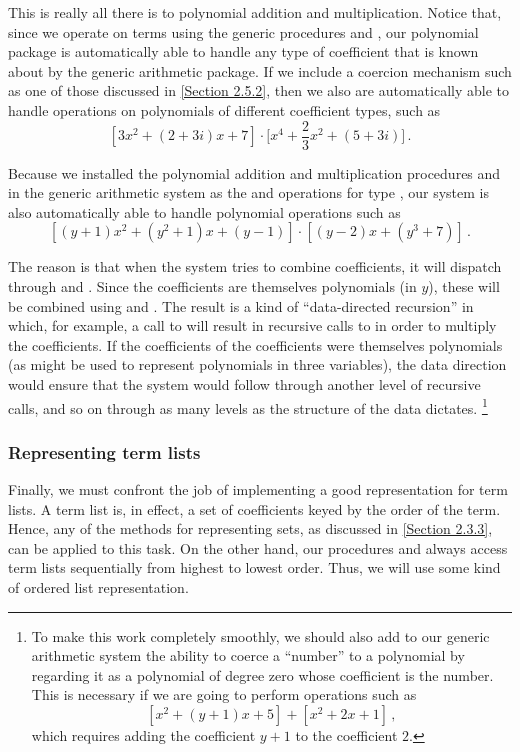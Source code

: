 This is really all there is to polynomial addition and multiplication.
Notice that, since we operate on terms using the generic procedures  and , our polynomial package is automatically able to handle any type of coefficient that is known about by the generic arithmetic package.
If we include a coercion mechanism such as one of those discussed in \cref{Section 2.5.2}, then we also are automatically able to handle operations on polynomials of different coefficient types, such as
\[
	[3 x^2 + (2 + 3i) x + 7]
	⋅ \biggl[ x^4 + \frac{2}{3} x^2 + (5 + 3i) \biggr] \,.
\]

Because we installed the polynomial addition and multiplication procedures  and  in the generic arithmetic system as the  and  operations for type , our system is also automatically able to handle polynomial operations such as
\[
	[ (y + 1) x^2 + (y^2 + 1) x + (y - 1) ] ⋅ [ (y - 2) x + (y^3 + 7) ] \,.
\]

The reason is that when the system tries to combine coefficients, it will dispatch through  and .
Since the coefficients are themselves polynomials (in \( y \)), these will be combined using  and .
The result is a kind of “data-directed recursion” in which, for example, a call to  will result in recursive calls to  in order to multiply the coefficients.
If the coefficients of the coefficients were themselves polynomials (as might be used to represent polynomials in three variables), the data direction would ensure that the system would follow through another level of recursive calls, and so on through as many levels as the structure of the data dictates.%
\footnote{
	To make this work completely smoothly, we should also add to our generic arithmetic system the ability to coerce a “number” to a polynomial by regarding it as a polynomial of degree zero whose coefficient is the number.
	This is necessary if we are going to perform operations such as
	\[
		[x^2 + (y + 1) x + 5] + [x^2 + 2 x + 1] \,,
	\]
	which requires adding the coefficient \( y + 1 \) to the coefficient \( 2 \).
}



\subsubsection*{Representing term lists}

Finally, we must confront the job of implementing a good representation for term lists.
A term list is, in effect, a set of coefficients keyed by the order of the term.
Hence, any of the methods for representing sets, as discussed in \cref{Section 2.3.3}, can be applied to this task.
On the other hand, our procedures  and  always access term lists sequentially from highest to lowest order.
Thus, we will use some kind of ordered list representation.

